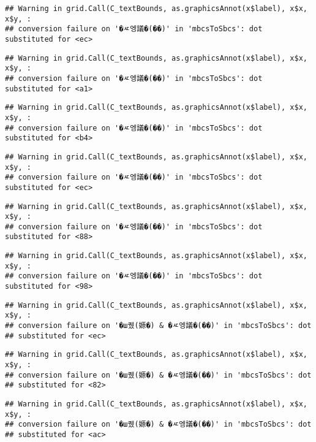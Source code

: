 \documentclass[
]{article}
\begin{document}
\begin{verbatim}
## Warning in grid.Call(C_textBounds, as.graphicsAnnot(x$label), x$x, x$y, :
## conversion failure on '�ㅼ엥議�(��)' in 'mbcsToSbcs': dot substituted for <ec>
\end{verbatim}

\begin{verbatim}
## Warning in grid.Call(C_textBounds, as.graphicsAnnot(x$label), x$x, x$y, :
## conversion failure on '�ㅼ엥議�(��)' in 'mbcsToSbcs': dot substituted for <a1>
\end{verbatim}

\begin{verbatim}
## Warning in grid.Call(C_textBounds, as.graphicsAnnot(x$label), x$x, x$y, :
## conversion failure on '�ㅼ엥議�(��)' in 'mbcsToSbcs': dot substituted for <b4>
\end{verbatim}

\begin{verbatim}
## Warning in grid.Call(C_textBounds, as.graphicsAnnot(x$label), x$x, x$y, :
## conversion failure on '�ㅼ엥議�(��)' in 'mbcsToSbcs': dot substituted for <ec>
\end{verbatim}

\begin{verbatim}
## Warning in grid.Call(C_textBounds, as.graphicsAnnot(x$label), x$x, x$y, :
## conversion failure on '�ㅼ엥議�(��)' in 'mbcsToSbcs': dot substituted for <88>
\end{verbatim}

\begin{verbatim}
## Warning in grid.Call(C_textBounds, as.graphicsAnnot(x$label), x$x, x$y, :
## conversion failure on '�ㅼ엥議�(��)' in 'mbcsToSbcs': dot substituted for <98>
\end{verbatim}

\begin{verbatim}
## Warning in grid.Call(C_textBounds, as.graphicsAnnot(x$label), x$x, x$y, :
## conversion failure on '�ш퀬(嫄�) & �ㅼ엥議�(��)' in 'mbcsToSbcs': dot
## substituted for <ec>
\end{verbatim}

\begin{verbatim}
## Warning in grid.Call(C_textBounds, as.graphicsAnnot(x$label), x$x, x$y, :
## conversion failure on '�ш퀬(嫄�) & �ㅼ엥議�(��)' in 'mbcsToSbcs': dot
## substituted for <82>
\end{verbatim}

\begin{verbatim}
## Warning in grid.Call(C_textBounds, as.graphicsAnnot(x$label), x$x, x$y, :
## conversion failure on '�ш퀬(嫄�) & �ㅼ엥議�(��)' in 'mbcsToSbcs': dot
## substituted for <ac>
\end{verbatim}
\end{document}
